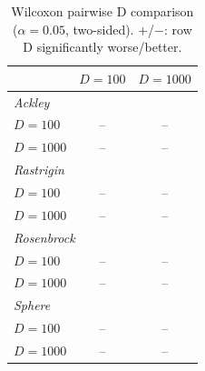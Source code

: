 
\begin{table}[htbp]\centering
\caption{Wilcoxon pairwise D comparison ($\alpha=0.05$, two-sided). $+$/$-$: row D significantly worse/better.}
\label{tab:wilcoxon}
\begin{tabular}{lcc}
\toprule
& $D=100$ & $D=1000$ \\
\midrule
\multicolumn{3}{l}{\textit{Ackley}} \\
  $D=100$ & -- & -- \\
  $D=1000$ & -- & -- \\
\multicolumn{3}{l}{\textit{Rastrigin}} \\
  $D=100$ & -- & -- \\
  $D=1000$ & -- & -- \\
\multicolumn{3}{l}{\textit{Rosenbrock}} \\
  $D=100$ & -- & -- \\
  $D=1000$ & -- & -- \\
\multicolumn{3}{l}{\textit{Sphere}} \\
  $D=100$ & -- & -- \\
  $D=1000$ & -- & -- \\
\bottomrule
\end{tabular}
\end{table}
